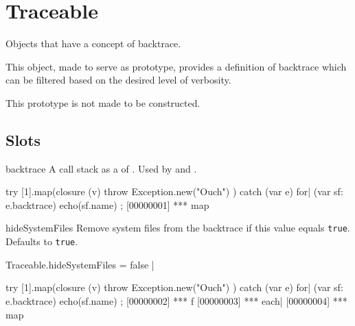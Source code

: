 
\section{Traceable}
Objects that have a concept of backtrace.

This object, made to serve as prototype, provides a definition of backtrace
which can be filtered based on the desired level of verbosity.

This prototype is not made to be constructed.

\subsection{Slots}

\begin{urbiscriptapi}
\item[backtrace] A call stack as a  of
  .  Used by  and
  .
\begin{urbiscript}
try
{
  [1].map(closure (v) { throw Exception.new("Ouch") })
}
catch (var e)
{
  for| (var sf: e.backtrace)
    echo(sf.name)
};
[00000001] *** map
\end{urbiscript}

\item[hideSystemFiles] Remove system files from the backtrace if this value
  equals \lstinline|true|.  Defaults to \lstinline|true|.
\begin{urbiscript}
Traceable.hideSystemFiles = false |

try
{
  [1].map(closure (v) { throw Exception.new("Ouch") })
}
catch (var e)
{
  for| (var sf: e.backtrace)
    echo(sf.name)
};
[00000002] *** f
[00000003] *** each|
[00000004] *** map
\end{urbiscript}

\end{urbiscriptapi}


